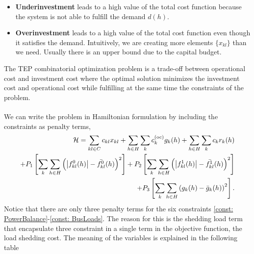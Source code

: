 \begin{itemize}
    \item \textbf{Underinvestment} leads to a high value of the total cost function because the system is not able to fulfill the demand $d(h)$.
    \item \textbf{Overinvestment} leads to a high value of the total cost function even though it satisfies the demand. Intuitively, we are creating more elements $\{x_{kl}\}$ than we need. Usually there is an upper bound due to the capital budget.
\end{itemize}
The TEP combinatorial optimization problem is a trade-off between operational cost and investment cost where the optimal solution minimizes the investment cost and operational cost while fulfilling at the same time the constraints of the problem.\\\\
We can write the problem in Hamiltonian formulation by including the constraints as penalty terms,
\begin{align}
    \mathcal{H} = \sum_{kl\in C}c_{kl}x_{kl} + \sum_{h \in H}\sum_{k}c_{k}^{(\text{oc})}g_{k}(h)+ \sum_{h \in H}\sum_{k}c_{k}r_{k}(h)\\
    + P_{1}\left[\sum_{k}\sum_{h\in H}\left(\abs{f_{kl}^{0}(h)} - \bar{f_{kl}^{0}}(h)   \right)^{2}\right] +
    P_{2}\left[\sum_{k}\sum_{h\in H}\left(\abs{f_{kl}^{1}(h)} - \bar{f_{kl}^{1}}(h)\right)^{2}\right]\\
    + P_{3}\left[\sum_{k}\sum_{h\in H}\left(g_{k}(h)-\bar{g}_{k}(h)\right)^{2}\right].
\end{align}
Notice that there are only three penalty terms for the six constraints \eqref{const: PowerBalance}-\eqref{const: BusLoads}. The reason for this is the shedding load term that encapsulate three constraint in a single term in the objective function, the load shedding cost.
The meaning of the variables is explained in the following table
